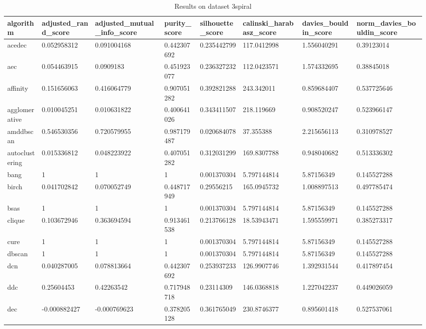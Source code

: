 \begin{table}[H]
\centering
\caption{Results on dataset 3spiral}
\label{tab:params:3spiral}
\begin{tabular}{|l|l|l|l|l|l|l|l|}
\hline
algorithm & adjusted\_rand\_score & adjusted\_mutual\_info\_score & purity\_score & silhouette\_score & calinski\_harabasz\_score & davies\_bouldin\_score & norm\_davies\_bouldin\_score \\
\hline
acedec & 0.052958312 & 0.091004168 & 0.442307692 & 0.235442799 & 117.0412998 & 1.556040291 & 0.39123014 \\
\hline
aec & 0.054463915 & 0.0909183 & 0.451923077 & 0.236327232 & 112.0423571 & 1.574332695 & 0.38845018 \\
\hline
affinity & 0.151656063 & 0.416064779 & 0.907051282 & 0.392821288 & 243.342011 & 0.859684407 & 0.537725646 \\
\hline
agglomerative & 0.010045251 & 0.010631822 & 0.400641026 & 0.343411507 & 218.119669 & 0.908520247 & 0.523966147 \\
\hline
amddbscan & 0.546530356 & 0.720579955 & 0.987179487 & 0.020684078 & 37.355388 & 2.215656113 & 0.310978527 \\
\hline
autoclustering & 0.015336812 & 0.048223922 & 0.407051282 & 0.312031299 & 169.8307788 & 0.948040682 & 0.513336302 \\
\hline
bang & 1 & 1 & 1 & 0.001370304 & 5.797144814 & 5.87156349 & 0.145527288 \\
\hline
birch & 0.041702842 & 0.070052749 & 0.448717949 & 0.29556215 & 165.0945732 & 1.008897513 & 0.497785474 \\
\hline
bsas & 1 & 1 & 1 & 0.001370304 & 5.797144814 & 5.87156349 & 0.145527288 \\
\hline
clique & 0.103672946 & 0.363694594 & 0.913461538 & 0.213766128 & 18.53943471 & 1.595559971 & 0.385273317 \\
\hline
cure & 1 & 1 & 1 & 0.001370304 & 5.797144814 & 5.87156349 & 0.145527288 \\
\hline
dbscan & 1 & 1 & 1 & 0.001370304 & 5.797144814 & 5.87156349 & 0.145527288 \\
\hline
dcn & 0.040287005 & 0.078813664 & 0.442307692 & 0.253937233 & 126.9907746 & 1.392931544 & 0.417897454 \\
\hline
ddc & 0.25604453 & 0.42263542 & 0.717948718 & 0.23114309 & 146.0368818 & 1.227042237 & 0.449026059 \\
\hline
dec & -0.000882427 & -0.000769623 & 0.378205128 & 0.361765049 & 230.8746377 & 0.895601418 & 0.527537061 \\

\end{tabular}
\end{table}
